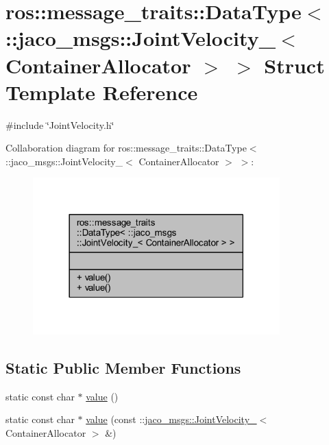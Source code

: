 \hypertarget{structros_1_1message__traits_1_1DataType_3_01_1_1jaco__msgs_1_1JointVelocity___3_01ContainerAllocator_01_4_01_4}{}\section{ros\+:\+:message\+\_\+traits\+:\+:Data\+Type$<$ \+:\+:jaco\+\_\+msgs\+:\+:Joint\+Velocity\+\_\+$<$ Container\+Allocator $>$ $>$ Struct Template Reference}
\label{structros_1_1message__traits_1_1DataType_3_01_1_1jaco__msgs_1_1JointVelocity___3_01ContainerAllocator_01_4_01_4}


{\ttfamily \#include \char`\"{}Joint\+Velocity.\+h\char`\"{}}



Collaboration diagram for ros\+:\+:message\+\_\+traits\+:\+:Data\+Type$<$ \+:\+:jaco\+\_\+msgs\+:\+:Joint\+Velocity\+\_\+$<$ Container\+Allocator $>$ $>$\+:
\nopagebreak
\begin{figure}[H]
\begin{center}
\leavevmode
\includegraphics[width=270pt]{de/d2e/structros_1_1message__traits_1_1DataType_3_01_1_1jaco__msgs_1_1JointVelocity___3_01ContainerAllocator_01_4_01_4__coll__graph}
\end{center}
\end{figure}
\subsection*{Static Public Member Functions}
\begin{DoxyCompactItemize}
\item 
static const char $\ast$ \hyperlink{structros_1_1message__traits_1_1DataType_3_01_1_1jaco__msgs_1_1JointVelocity___3_01ContainerAllocator_01_4_01_4_a3a628fa73c5209fdd928da2e65294c93}{value} ()
\item 
static const char $\ast$ \hyperlink{structros_1_1message__traits_1_1DataType_3_01_1_1jaco__msgs_1_1JointVelocity___3_01ContainerAllocator_01_4_01_4_a031dd686d7d274366d215aa3ae335f17}{value} (const \+::\hyperlink{structjaco__msgs_1_1JointVelocity__}{jaco\+\_\+msgs\+::\+Joint\+Velocity\+\_\+}$<$ Container\+Allocator $>$ \&)
\end{DoxyCompactItemize}


